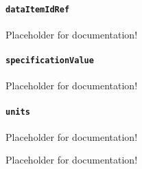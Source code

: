 \paragraph{\texttt{dataItemIdRef}}\mbox{}
\newline\tab Placeholder for documentation!

\paragraph{\texttt{specificationValue}}\mbox{}
\newline\tab Placeholder for documentation!

\paragraph{\texttt{units}}\mbox{}
\newline\tab Placeholder for documentation!

Placeholder for documentation!

